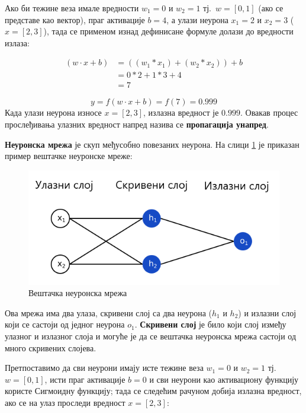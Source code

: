 \documentclass[12pt, а4paper]{article}
\begin{document}
Ако би тежине веза имале вредности $w_1 = 0$ и $w_2 = 1$ тј.\ $w=[0,1]$
(ако се представе као вектор),
праг активације $b = 4$, а
улази неурона $x_1 = 2$ и $x_2 = 3$ ($x=[2,3]$), тада се применом изнад дефинисане
формуле долази до вредности излаза:

\begin{equation}
\begin{split}
(w \cdot x + b) & = ((w_1 * x_1) + (w_2 * x_2)) + b \\
& = 0 * 2 + 1 * 3 + 4 \\
& = 7
\end{split}
\end{equation}

\begin{equation}
y = f(w \cdot x + b) = f(7) = 0.999
\end{equation}
Када улази неурона износе $x=[2,3]$, излазна вредност је $0.999$.
Овакав процес прослеђивања улазних вредност напред назива се \textbf{пропагација унапред}.

\textbf{Неуронска мрежа} је скуп међусобно повезаних неурона. На слици
\ref{fig:neuronskaMreza} је приказан пример вештачке неуронске мреже:

\begin{figure}[H]
  \centering
      \includegraphics[scale=0.6]{slike/neuronskaMreza}
  \caption{Вештачка неуронска мрежа}
  \label{fig:neuronskaMreza}
\end{figure}

Ова мрежа има два улаза, скривени слој са два неурона ($h_1$ и $h_2$) и
излазни слој који се састоји од једног неурона $o_1$. \textbf{Скривени слој}
је било који слој између улазног и излазног слоја и могуће је да се
вештачка неуронска мрежа састоји од много скривених слојева.

Претпоставимо да сви неурони имају исте тежине веза
$w_1 = 0$ и $w_2 = 1$ тј.\ $w = [0,1]$, исти праг активације $b = 0$ и
сви неурони као активациону функцију користе Сигмоидну функцију; тада
се следећим рачуном добија излазна вредност, ако се на улаз проследи
вредност $x=[2,3]$:
\end{document}
